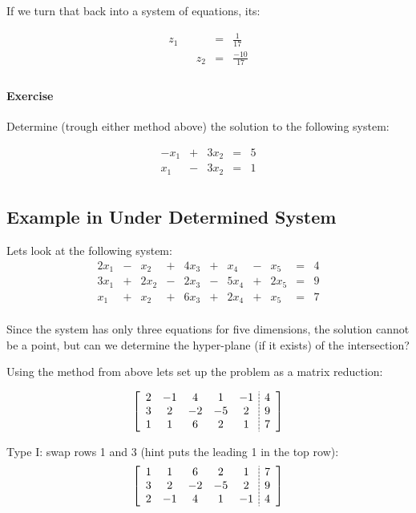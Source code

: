 If we turn that back into a system of equations, its: 

\[\begin{array}{rcrcr}
 z_1 & &  & = & \frac{1}{17}\\
 & & z_2 & = & \frac{-10}{17}\\
\end{array}\]



\paragraph{Exercise} Determine (trough either method above) the solution to the following system: 

\[\begin{array}{rcrcr}
-x_1 & +  & 3 x_2 & = & 5\\
x_1 & -  &  3x_2 & = & 1\\
\end{array}\]

\subsection{Example in Under Determined System}
Lets look at the following system: 
\[\begin{array}{rcrcrcrcrcr}
2x_1 & - & x_2 & + & 4x_3 & + & x_4 & - & x_5 & = & 4\\
3x_1 & + & 2x_2 & - & 2x_3 & - & 5x_4 & + & 2x_5 & = & 9\\
x_1 & + & x_2 & + & 6x_3 & + & 2x_4 & + & x_5 & = & 7\\
\end{array}\]

Since the system has only three equations for five dimensions, the solution cannot be a point,
but can we determine the hyper-plane (if it exists) of the intersection? 

Using the method from above lets set up the problem as a matrix reduction: 

\[\left[\begin{array}{ccccc;{2pt/1pt}c} 
2 & -1 & 4 & 1 & -1 & 4\\
3 & 2 & -2 & -5 &  2 & 9\\
1 & 1 & 6 & 2 &  1 & 7\\
\end{array}\right]\]

Type I: swap rows 1 and 3 (hint puts the leading 1 in the top row):
\[\left[\begin{array}{ccccc;{2pt/1pt}c} 
1 & 1 & 6 & 2 &  1 & 7\\
3 & 2 & -2 & -5 &  2 & 9\\
2 & -1 & 4 & 1 & -1 & 4\\
\end{array}\right]\]

